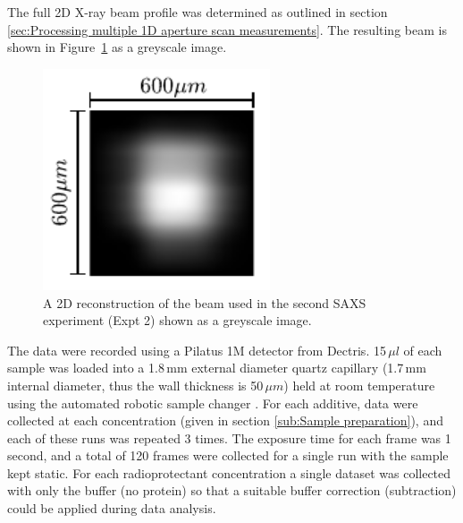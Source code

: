 The full 2D X-ray beam profile was determined as outlined in section \ref{sec:Processing multiple 1D aperture scan measurements}. The resulting beam is shown in Figure~\ref{fig:SAXS beam profile} as a greyscale image.
\begin{figure}
    \centering
    \includegraphics[width=0.6\textwidth]{figures/saxs/SAXS_beam.pdf}
    \caption[A 2D reconstruction of beam used in the second SAXS experiment]{A 2D reconstruction of the beam used in the second SAXS experiment (Expt 2) shown as a greyscale image.}
    \label{fig:SAXS beam profile}
\end{figure}

The data were recorded using a Pilatus 1M detector from Dectris.
15\,$\mu l$ of each sample was loaded into a 1.8$\,$mm external diameter quartz capillary (1.7\,mm internal diameter, thus the wall thickness is 50\,$\mu m$) held at room temperature using the automated robotic sample changer \cite{round2015biosaxs}.
For each additive, data were collected at each concentration (given in section \ref{sub:Sample preparation}), and each of these runs was repeated 3 times.
The exposure time for each frame was 1 second, and a total of 120 frames were collected for a single run with the sample kept static.
For each radioprotectant concentration a single dataset was collected with only the buffer (no protein) so that a suitable buffer correction (subtraction) could be applied during data analysis.

